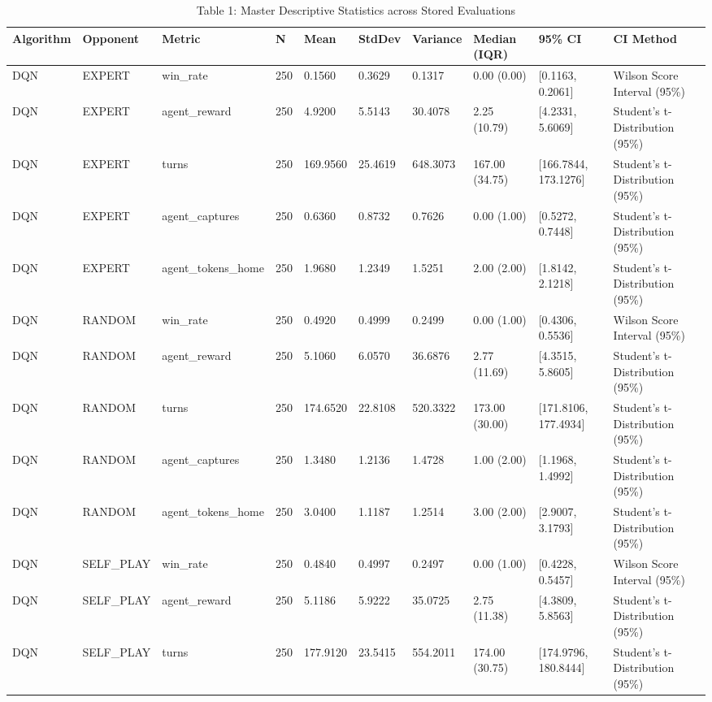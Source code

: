 \begin{table}
\caption{Table 1: Master Descriptive Statistics across Stored Evaluations}
\label{tab:table1_descriptive_summary}
\begin{tabular}{llllllllll}
\toprule
Algorithm & Opponent & Metric & N & Mean & StdDev & Variance & Median (IQR) & 95\% CI & CI Method \\
\midrule
DQN & EXPERT & win\_rate & 250 & 0.1560 & 0.3629 & 0.1317 & 0.00 (0.00) & [0.1163, 0.2061] & Wilson Score Interval (95\%) \\
DQN & EXPERT & agent\_reward & 250 & 4.9200 & 5.5143 & 30.4078 & 2.25 (10.79) & [4.2331, 5.6069] & Student's t-Distribution (95\%) \\
DQN & EXPERT & turns & 250 & 169.9560 & 25.4619 & 648.3073 & 167.00 (34.75) & [166.7844, 173.1276] & Student's t-Distribution (95\%) \\
DQN & EXPERT & agent\_captures & 250 & 0.6360 & 0.8732 & 0.7626 & 0.00 (1.00) & [0.5272, 0.7448] & Student's t-Distribution (95\%) \\
DQN & EXPERT & agent\_tokens\_home & 250 & 1.9680 & 1.2349 & 1.5251 & 2.00 (2.00) & [1.8142, 2.1218] & Student's t-Distribution (95\%) \\
DQN & RANDOM & win\_rate & 250 & 0.4920 & 0.4999 & 0.2499 & 0.00 (1.00) & [0.4306, 0.5536] & Wilson Score Interval (95\%) \\
DQN & RANDOM & agent\_reward & 250 & 5.1060 & 6.0570 & 36.6876 & 2.77 (11.69) & [4.3515, 5.8605] & Student's t-Distribution (95\%) \\
DQN & RANDOM & turns & 250 & 174.6520 & 22.8108 & 520.3322 & 173.00 (30.00) & [171.8106, 177.4934] & Student's t-Distribution (95\%) \\
DQN & RANDOM & agent\_captures & 250 & 1.3480 & 1.2136 & 1.4728 & 1.00 (2.00) & [1.1968, 1.4992] & Student's t-Distribution (95\%) \\
DQN & RANDOM & agent\_tokens\_home & 250 & 3.0400 & 1.1187 & 1.2514 & 3.00 (2.00) & [2.9007, 3.1793] & Student's t-Distribution (95\%) \\
DQN & SELF\_PLAY & win\_rate & 250 & 0.4840 & 0.4997 & 0.2497 & 0.00 (1.00) & [0.4228, 0.5457] & Wilson Score Interval (95\%) \\
DQN & SELF\_PLAY & agent\_reward & 250 & 5.1186 & 5.9222 & 35.0725 & 2.75 (11.38) & [4.3809, 5.8563] & Student's t-Distribution (95\%) \\
DQN & SELF\_PLAY & turns & 250 & 177.9120 & 23.5415 & 554.2011 & 174.00 (30.75) & [174.9796, 180.8444] & Student's t-Distribution (95\%) \\

\end{tabular}
\end{table}
